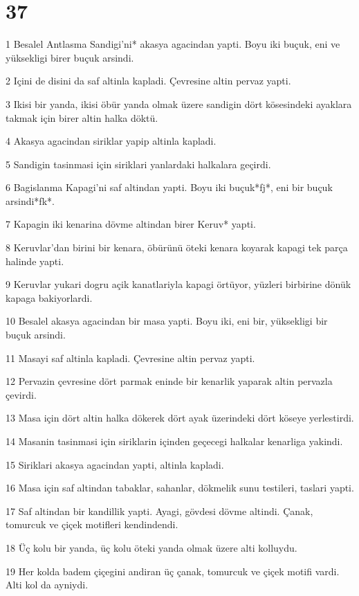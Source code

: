 \chapter{37}

\par 1 Besalel Antlasma Sandigi'ni* akasya agacindan yapti. Boyu iki buçuk, eni ve yüksekligi birer buçuk arsindi.
\par 2 Içini de disini da saf altinla kapladi. Çevresine altin pervaz yapti.
\par 3 Ikisi bir yanda, ikisi öbür yanda olmak üzere sandigin dört kösesindeki ayaklara takmak için birer altin halka döktü.
\par 4 Akasya agacindan siriklar yapip altinla kapladi.
\par 5 Sandigin tasinmasi için siriklari yanlardaki halkalara geçirdi.
\par 6 Bagislanma Kapagi'ni saf altindan yapti. Boyu iki buçuk*fj*, eni bir buçuk arsindi*fk*.
\par 7 Kapagin iki kenarina dövme altindan birer Keruv* yapti.
\par 8 Keruvlar'dan birini bir kenara, öbürünü öteki kenara koyarak kapagi tek parça halinde yapti.
\par 9 Keruvlar yukari dogru açik kanatlariyla kapagi örtüyor, yüzleri birbirine dönük kapaga bakiyorlardi.
\par 10 Besalel akasya agacindan bir masa yapti. Boyu iki, eni bir, yüksekligi bir buçuk arsindi.
\par 11 Masayi saf altinla kapladi. Çevresine altin pervaz yapti.
\par 12 Pervazin çevresine dört parmak eninde bir kenarlik yaparak altin pervazla çevirdi.
\par 13 Masa için dört altin halka dökerek dört ayak üzerindeki dört köseye yerlestirdi.
\par 14 Masanin tasinmasi için siriklarin içinden geçecegi halkalar kenarliga yakindi.
\par 15 Siriklari akasya agacindan yapti, altinla kapladi.
\par 16 Masa için saf altindan tabaklar, sahanlar, dökmelik sunu testileri, taslari yapti.
\par 17 Saf altindan bir kandillik yapti. Ayagi, gövdesi dövme altindi. Çanak, tomurcuk ve çiçek motifleri kendindendi.
\par 18 Üç kolu bir yanda, üç kolu öteki yanda olmak üzere alti kolluydu.
\par 19 Her kolda badem çiçegini andiran üç çanak, tomurcuk ve çiçek motifi vardi. Alti kol da ayniydi.
